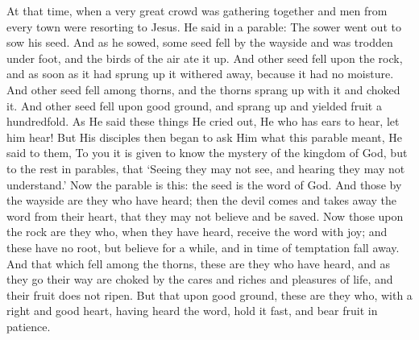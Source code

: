 {{At that time, when a very great crowd was gathering together and men from every town were resorting to Jesus. He said in a parable: The sower went out to sow his seed. And as he sowed, some seed fell by the wayside and was trodden under foot, and the birds of the air ate it up. And other seed fell upon the rock, and as soon as it had sprung up it withered away, because it had no moisture. And other seed fell among thorns, and the thorns sprang up with it and choked it. And other seed fell upon good ground, and sprang up and yielded fruit a hundredfold. As He said these things He cried out, He who has ears to hear, let him hear! But His disciples then began to ask Him what this parable meant, He said to them, To you it is given to know the mystery of the kingdom of God, but to the rest in parables, that ‘Seeing they may not see, and hearing they may not understand.’ Now the parable is this: the seed is the word of God. And those by the wayside are they who have heard; then the devil comes and takes away the word from their heart, that they may not believe and be saved. Now those upon the rock are they who, when they have heard, receive the word with joy; and these have no root, but believe for a while, and in time of temptation fall away. And that which fell among the thorns, these are they who have heard, and as they go their way are choked by the cares and riches and pleasures of life, and their fruit does not ripen. But that upon good ground, these are they who, with a right and good heart, having heard the word, hold it fast, and bear fruit in patience.
  }
}
\newcommand{\offertory}{%
  Pérfice gressus meos in sémitis tuis, ut non moveántur vestígia mea: inclína aurem tuam, et exáudi verba mea: mirífica misericórdias tuas, qui salvos facis sperántes in te, Dómine.
}
\newcommand{\offertoryTranslation}{%
  Make my steps steadfast in Your paths, that my feet may not falter. Incline Your ear to me; hear my word. Show Your wondrous kindness, O Lord, Saviour of those who trust in You.
}
\newcommand{\secret}{%
  \l{%
    Oblátum tibi, Dómine, sacrifícium, vivíficet nos semper et múniat.
  }
  \e{%
    May this sacrifice which we offer You, O Lord, ever give us new life and protection.
  }
  \per
}
\newcommand{\communion}{%
  Introíbo ad altáre Dei, ad Deum, qui lætíficat iuventútem meam.
}
\newcommand{\communionTranslation}{%
  I will go in to the altar of God, the God of my gladness and joy.
}
\newcommand{\postcommunion}{%
  \l{%
    Súpplices te rogámus, omnípotens Deus: ut, quos tuis réficis sacraméntis, tibi étiam plácitis móribus dignánter deservíre concédas.
  }
  \e{%
    O almighty God, grant, we humbly beseech You, that those whom You refresh with Your sacrament may also worthily serve You in a way that is well pleasing to You.
  }
  \per
}

